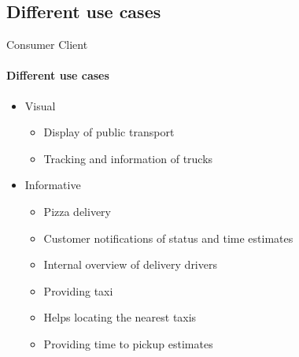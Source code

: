 \subsection{Different use cases}

\begin{frame}{Consumer Client}
    \framesubtitle{Different use cases}
    \begin{itemize}
        \item<1-> Visual
        \begin{itemize}
            \item<2-> Display of public transport
            \item<2-> Tracking and information of trucks
        \end{itemize}

        \item<1-> Informative
        \begin{itemize}
            \item<3-> Pizza delivery
            \item<3-> Customer notifications of status and time estimates
            \item<3-> Internal overview of delivery drivers
            \item<4-> Providing taxi
            \item<4-> Helps locating the nearest taxis
            \item<4-> Providing time to pickup estimates
        \end{itemize}

    \end{itemize}

\end{frame}


